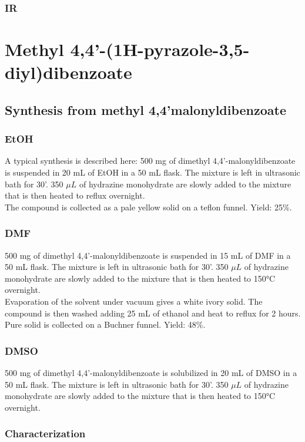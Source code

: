 \documentclass[../Master.tex]{subfiles}
\begin{document}
\subsubsection{IR}
\section{Methyl 4,4'-(1H-pyrazole-3,5-diyl)dibenzoate}
\subsection{Synthesis from methyl 4,4'malonyldibenzoate}
\subsubsection{EtOH}
A typical synthesis is described here:
500 mg of dimethyl 4,4'-malonyldibenzoate is suspended in 20 mL of EtOH in a 50 mL flask. The mixture is left in ultrasonic bath for 30'. 350 \(\mu L\) of hydrazine monohydrate are slowly added to the mixture that is then heated to reflux overnight.\\
The compound is collected as a pale yellow solid on a teflon funnel. Yield: 25\%.
\subsubsection{DMF}
500 mg of dimethyl 4,4'-malonyldibenzoate is suspended in 15 mL of DMF in a 50 mL flask. The mixture is left in ultrasonic bath for 30'. 350 \(\mu L\) of hydrazine monohydrate are slowly added to the mixture that is then heated to 150°C overnight.\\
Evaporation of the solvent under vacuum gives a white ivory solid. The compound is then washed adding 25 mL of ethanol and heat to reflux for 2 hours. Pure solid is collected on a Buchner funnel. Yield: 48\%.
\subsubsection{DMSO}
500 mg of dimethyl 4,4'-malonyldibenzoate is solubilized in 20 mL of DMSO in a 50 mL flask. The mixture is left in ultrasonic bath for 30'. 350 \(\mu L\) of hydrazine monohydrate are slowly added to the mixture that is then heated to 150°C overnight.\\
\pagebreak
\subsubsection{Characterization}
\newline
\end{document}
